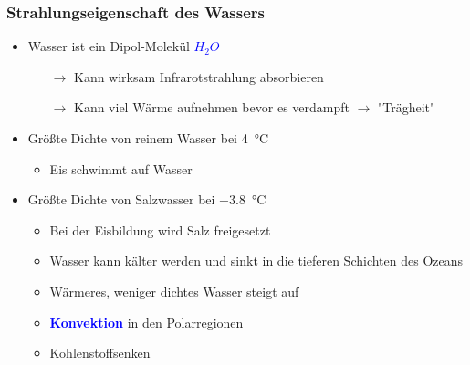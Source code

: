 \begin{frame}
	\frametitle{Strahlungseigenschaft des Wassers} %
	\begin{itemize}
		\item Wasser ist ein Dipol-Molekül \textcolor{blue}{$H_2O$}
		\begin{itemize}			
			\item[$\rightarrow$] Kann wirksam Infrarotstrahlung absorbieren
			\item[$\rightarrow$] Kann viel Wärme aufnehmen bevor es verdampft $\rightarrow$ "Trägheit"
		\end{itemize}
		
		\item<3-> Größte Dichte von reinem Wasser bei \SI{4}{\degreeCelsius}
		\begin{itemize}
			\item<2->[$\rightarrow$] Eis schwimmt auf Wasser
		\end{itemize}		
		\item<5->Größte Dichte von Salzwasser bei \SI{-3,8}{\degreeCelsius}
		\begin{itemize}
			\item<3-> [] Bei der Eisbildung wird Salz freigesetzt
			\item<3-> [$\rightarrow$] Wasser kann kälter werden und sinkt in die tieferen Schichten des Ozeans
			\item<3-> [$\rightarrow$] Wärmeres, weniger dichtes Wasser steigt auf
			\item<3-> [] \textbf{\textcolor{blue}{Konvektion}} in den Polarregionen 
			\item<3-> [$\rightarrow$] Kohlenstoffsenken
		\end{itemize}
	\end{itemize}



\end{frame}

